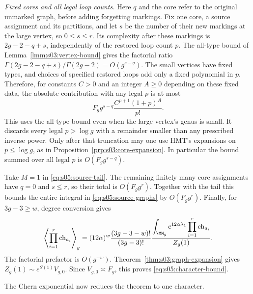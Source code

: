\begin{prf}
\emph{Fixed cores and all legal loop counts.}
Here $q$ and the core refer to the original unmarked graph, before
adding forgetting markings. Fix one core, a source assignment and
its partitions, and let $s$ be the number of their new markings at
the large vertex, so $0\leq s\leq r$. Its complexity after these
markings is $2g-2-q+s$, independently of the restored loop count
$p$. The all-type bound of Lemma~\ref{lmm:s03:vertex-bound} gives
the factorial ratio
$\Gamma(2g-2-q+s)/\Gamma(2g-2)=O(g^{s-q})$.
The small vertices have fixed types, and choices of specified
restored loops add only a fixed polynomial in $p$. Therefore, for
constants $C>0$ and an integer $A\geq0$ depending on these fixed
data, the absolute contribution with any legal $p$ is at most
\begin{equation}\label{eq:s05:decorated-core-bound}
 F_g g^{s-q}\frac{C^{p+1}(1+p)^A}{p!}.
\end{equation}
This uses the all-type bound even when the large vertex's genus is
small. It discards every legal $p>\log g$ with a remainder smaller
than any prescribed inverse power. Only after that truncation may
one use HMT's expansions on $p\leq\log g$, as in
Proposition~\ref{prp:s03:core-expansion}. In particular the bound
summed over all legal $p$ is $O(F_g g^{s-q})$.

Take $M=1$ in \eqref{eq:s05:source-tail}. The remaining finitely
many core assignments have $q=0$ and $s\leq r$, so their total is
$O(F_g g^r)$. Together with the tail this bounds the entire
integral in \eqref{eq:s05:source-graphs} by $O(F_g g^r)$.
Finally, for $3g-3\geq w$, degree conversion gives
\begin{equation}\label{eq:s05:character-normalization}
 \left\langle\prod_{i=1}^r\mathrm{ch}_{a_i}\right\rangle_g
 =(12\alpha)^w\frac{(3g-3-w)!}{(3g-3)!}
 \frac{\displaystyle\int_{\MM_g}e^{12\alpha\lambda_1}
                    \prod_{i=1}^r\mathrm{ch}_{a_i}}
      {Z_g(1)}.
\end{equation}
The factorial prefactor is $O(g^{-w})$.
Theorem~\ref{thm:s03:graph-expansion} gives
$Z_g(1)\sim e^{S(1)}V_{g,0}$.
Since $V_{g,0}\asymp F_g$, this proves
\eqref{eq:s05:character-bound}.
\end{prf}

The Chern exponential now reduces the theorem to one character.

